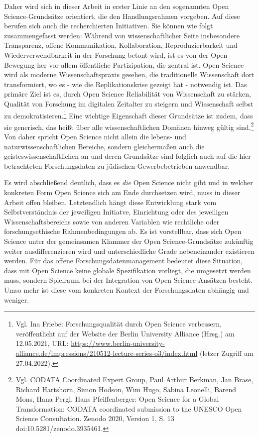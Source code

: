 Daher wird sich in dieser Arbeit in erster Linie an den sogenannten Open Science-Grundsätze orientiert, die den Handlungsrahmen vorgeben. Auf diese berufen sich auch die recherchierten Initiativen. Sie können wie folgt zusammengefasst werden: Während von wissenschaftlicher Seite insbesondere Transparenz, offene Kommunikation, Kollaboration, Reproduzierbarkeit und Wiederverwendbarkeit in der Forschung betont wird, ist es von der Open-Bewegung her vor allem öffentliche Partizipation, die zentral ist. Open Science wird als moderne Wissenschaftspraxis gesehen, die traditionelle Wissenschaft dort transformiert, wo es - wie die Replikationskrise gezeigt hat - notwendig ist. Das primäre Ziel ist es, durch Open Science Reliabilität von Wissenschaft zu stärken, Qualität von Forschung im digitalen Zeitalter zu steigern und Wissenschaft selbst zu demokratisieren.\footnote{Vgl. Ina Friebe: Forschungsqualität durch Open Science verbessern, veröffentlicht auf der Website der Berlin University Alliance (Hrsg.) am 12.05.2021, URL: \url{https://www.berlin-university-alliance.de/impressions/210512-lecture-series-o3/index.html} (letzer Zugriff am 27.04.2022).} Eine wichtige Eigenschaft dieser Grundsätze ist zudem, dass sie generisch, das heißt über alle wissenschaftlichen Domänen hinweg gültig sind.\footnote{Vgl. CODATA Coordinated Expert Group, Paul Arthur Berkman, Jan Brase, Richard Hartshorn, Simon Hodson, Wim Hugo, Sabina Leonelli, Barend Mons, Hana Pergl, Hans Pfeiffenberger: Open Science for a Global Transformation: CODATA coordinated submission to the UNESCO Open Science Consultation. Zenodo 2020, Version 1, S. 13 doi:10.5281/zenodo.3935461.} Von daher spricht Open Science nicht allein die lebens- und naturwissenschaftlichen Bereiche, sondern gleichermaßen auch die geisteswissenschaftlichen an und deren Grundsätze sind folglich auch auf die hier betrachteten Forschungsdaten zu jüdischen Gewerbebetrieben anwendbar.

Es wird abschließend deutlich, dass es \textit{die} Open Science nicht gibt und in welcher konkreten Form Open Science sich am Ende durchsetzen wird, muss in dieser Arbeit offen bleiben. Letztendlich hängt diese Entwicklung stark vom Selbstverständnis der jeweiligen Initiatve, Einrichtung oder des jeweiligen Wissenschaftsbereichs sowie von anderen Variablen wie rechtliche oder forschungsethische Rahmenbedingungen ab. Es ist vorstellbar, dass sich Open Science unter der gemeinsamen Klammer der Open Science-Grundsätze zukünftig weiter ausdifferenzieren wird und unterschiedliche Grade nebeneinander existieren werden. Für das offene Forschungsdatenmanagement bedeutet diese Situation, dass mit Open Science keine globale Spezifikation vorliegt, die umgesetzt werden muss, sondern Spielraum bei der Integration von Open Science-Ansätzen besteht. Umso mehr ist diese vom konkreten Kontext der Forschungsdaten abhängig und weniger.

